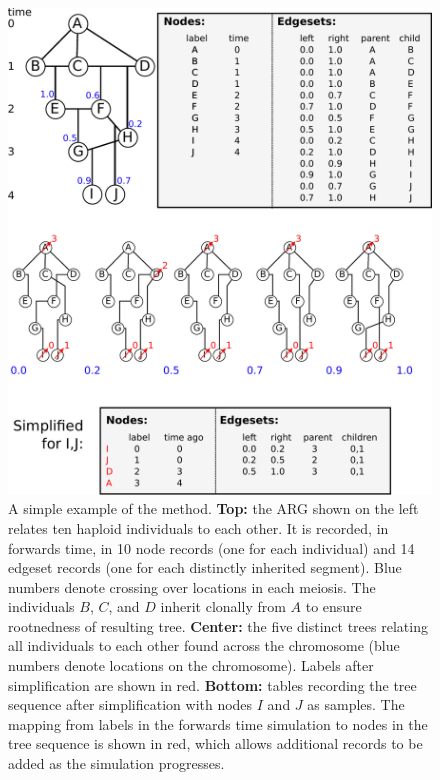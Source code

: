 \documentclass{article}
\begin{document}
\begin{figure}
    \begin{center}
        \includegraphics{method_diagram}
    \end{center}
    \caption{
        A simple example of the method.
        \textbf{Top:} the ARG shown on the left relates ten haploid individuals to each other.
        It is recorded, in forwards time, 
        in 10 node records (one for each individual)
        and 14 edgeset records (one for each distinctly inherited segment).
        Blue numbers denote crossing over locations in each meiosis.
        The individuals $B$, $C$, and $D$ inherit clonally from $A$
        to ensure rootnedness of resulting tree.
        \textbf{Center:} the five distinct trees relating all individuals to each other
        found across the chromosome (blue numbers denote locations on the chromosome).
        Labels after simplification are shown in red.
        \textbf{Bottom:} tables recording the tree sequence after simplification 
        with nodes $I$ and $J$ as samples.
        The mapping from labels in the forwards time simulation to nodes in the tree sequence
        is shown in red,
        which allows additional records to be added as the simulation progresses.
        \label{fig:method_diagram}
    }
\end{figure}
\end{document}
